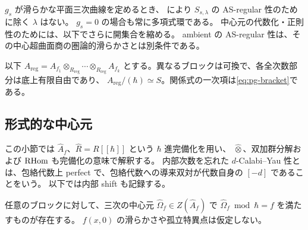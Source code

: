 \begin{remark}\label{rem:pg-regular-all}
$g_s$ が滑らかな平面三次曲線を定めるとき、
\cite[Theorem 4.2(1)]{PMoriSmith}により $S_{s,\lambda}$ の AS-regular 性のために除く $\lambda$ はない。
$g_s=0$ の場合も常に多項式環である。
中心元の代数化・正則性のためには、以下でさらに開集合を縮める。
ambient の AS-regular 性は、その中心超曲面商の圏論的滑らかさとは別条件である。
\end{remark}
以下
$A_{\mathrm{reg}}=A_{f_1}\otimes_{R_{\mathrm{reg}}}\cdots\otimes_{R_{\mathrm{reg}}}A_{f_k}$
とする。異なるブロックは可換で、各全次数部分は底上有限自由であり、
$A_{\mathrm{reg}}/(\hbar)\simeq S$。関係式の一次項は\eqref{eq:pg-bracket}である。

\subsection{形式的な中心元}
この小節では $\widehat A_f$、$\widehat R=R[[\hbar]]$ という $\hbar$ 進完備化を用い、
$\widehat\otimes$、双加群分解および $\operatorname{RHom}$ も完備化の意味で解釈する。
内部次数を忘れた $d$-Calabi--Yau 性とは、包絡代数上 perfect で、包絡代数への導来双対が代数自身の $[-d]$ であることをいう。
以下では内部 shift も記録する。
\begin{lemma}\label{lem:pg-formal-center}
任意のブロックに対して、三次の中心元
$\widehat\Omega_f\in Z(\widehat A_f)$ で
$\widehat\Omega_f\bmod\hbar=f$ を満たすものが存在する。
$f(x,0)$ の滑らかさや孤立特異点は仮定しない。
\end{lemma}
